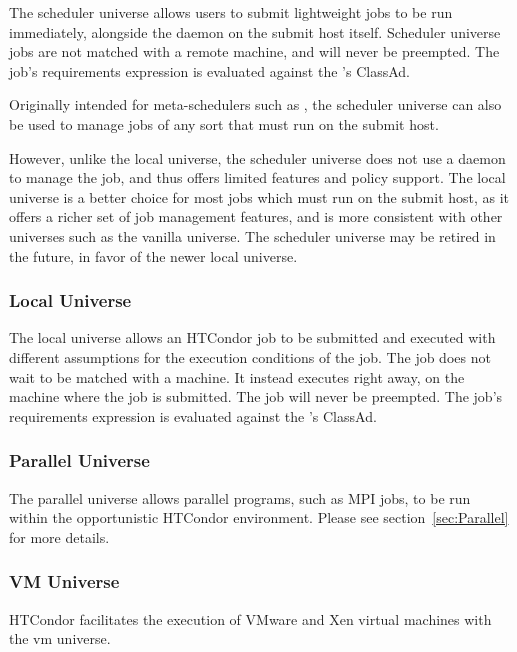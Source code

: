 
The scheduler universe allows users to submit lightweight jobs
to be run immediately, alongside the  daemon on the submit host
itself.
Scheduler universe jobs are not matched with a remote machine,
and will never be preempted.
The job's requirements expression is evaluated against the 's
ClassAd.

Originally intended for meta-schedulers such as ,
the scheduler universe can also be
used to manage jobs of any sort that must run on the submit host.

However, unlike the local universe, the scheduler
universe does not use a  daemon to manage the job, and thus
offers limited features and policy support.  The local universe
is a better choice for most jobs which must run on the submit host, as
it offers a richer set of job management features, and is more
consistent with other universes such as the vanilla universe.
The scheduler universe may be retired in the future, in
favor of the newer local universe.


\subsubsection{\label{sec:local-universe}Local Universe}

The local universe allows an HTCondor job to be submitted and
executed with different assumptions for the execution conditions
of the job.
The job does not wait to be matched with a machine.
It instead executes right away, on the machine where the job
is submitted.
The job will never be preempted.
The job's requirements expression is evaluated against the 's
ClassAd.

\subsubsection{Parallel Universe}
The parallel universe allows parallel programs, such as MPI jobs,
to be run within the opportunistic HTCondor environment.
Please see section~\ref{sec:Parallel} for more details.

\subsubsection{VM Universe}
HTCondor facilitates the execution of VMware and Xen
virtual machines with the vm universe.

